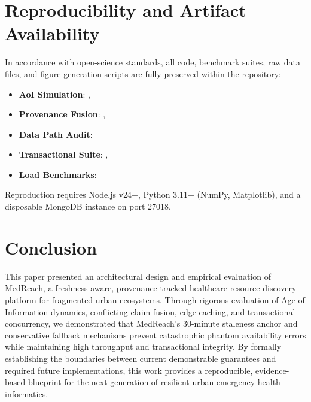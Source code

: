 \documentclass[conference]{IEEEtran}
\begin{document}
\section{Reproducibility and Artifact Availability}

In accordance with open-science standards, all code, benchmark suites, raw data files, and figure generation scripts are fully preserved within the repository:
\begin{itemize}
    \item \textbf{AoI Simulation}: , 
    \item \textbf{Provenance Fusion}: , 
    \item \textbf{Data Path Audit}: 
    \item \textbf{Transactional Suite}: , 
    \item \textbf{Load Benchmarks}: 
\end{itemize}

Reproduction requires Node.js v24+, Python 3.11+ (NumPy, Matplotlib), and a disposable MongoDB instance on port 27018.

\section{Conclusion}

This paper presented an architectural design and empirical evaluation of MedReach, a freshness-aware, provenance-tracked healthcare resource discovery platform for fragmented urban ecosystems. Through rigorous evaluation of Age of Information dynamics, conflicting-claim fusion, edge caching, and transactional concurrency, we demonstrated that MedReach's 30-minute staleness anchor and conservative fallback mechanisms prevent catastrophic phantom availability errors while maintaining high throughput and transactional integrity. By formally establishing the boundaries between current demonstrable guarantees and required future implementations, this work provides a reproducible, evidence-based blueprint for the next generation of resilient urban emergency health informatics.



\end{document}
